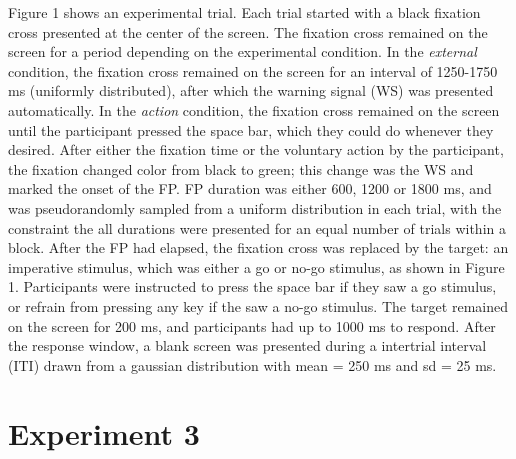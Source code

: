 \documentclass{article}
\begin{document}
Figure 1 shows an experimental trial. Each trial started with a black fixation cross presented at the center of the screen. The fixation cross remained on the screen for a period depending on the experimental condition. In the \textit{external} condition, the fixation cross remained on the screen for an interval of 1250-1750 ms (uniformly distributed), after which the warning signal (WS) was presented automatically. In the \textit{action} condition, the fixation cross remained on the screen until the participant pressed the space bar, which they could do whenever they desired. After either the fixation time or the voluntary action by the participant, the fixation changed color from black to green; this change was the WS and marked the onset of the FP. FP duration was either 600, 1200 or 1800 ms, and was pseudorandomly sampled from a uniform distribution in each trial, with the constraint the all durations were presented for an equal number of trials within a block. After the FP had elapsed, the fixation cross was replaced by the target: an imperative stimulus, which was either a go or no-go stimulus, as shown in Figure 1. Participants were instructed to press the space bar if they saw a go stimulus, or refrain from pressing any key if the saw a no-go stimulus. The target remained on the screen for 200 ms, and participants had up to 1000 ms to respond. After the response window, a blank screen was presented during a intertrial interval (ITI) drawn from a gaussian distribution with mean = 250 ms and sd = 25 ms. %

\section{Experiment 3}



\printbibliography
%
\end{document}
